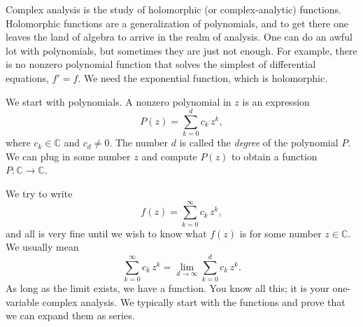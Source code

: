\documentclass[12pt,openany]{book}
\newcommand{\C}{{\mathbb{C}}}
\theoremstyle{plain}
\theoremstyle{remark}
\theoremstyle{definition}
\theoremstyle{exercise}
\theoremstyle{example}
\begin{document}
\medskip

Complex analysis is the study of holomorphic (or complex-analytic)
functions.
Holomorphic functions are a generalization of polynomials,
and to get there one leaves the land of algebra to arrive in the realm of
analysis.
One can do an awful lot with polynomials, but sometimes they are
just not enough.  For example, there is no nonzero polynomial function that solves
the simplest of differential equations, $f' = f$.  We need the exponential
function, which is holomorphic.

We start with polynomials.  A nonzero polynomial in $z$ is
an expression
\begin{equation*}
P(z) = \sum_{k=0}^d c_k \, z^k ,
\end{equation*}
where $c_k \in \C$ and $c_d \neq 0$.  The number $d$ is called the
\emph{degree}
of the
polynomial $P$.  We can plug in some number $z$ and compute
$P(z)$ to obtain a function $P \colon \C \to \C$.

We try to write
\begin{equation*}
f(z) = \sum_{k=0}^\infty c_k \, z^k ,
\end{equation*}
and all is very fine until we wish to know what $f(z)$ is for some number
$z \in \C$.
We usually mean
\begin{equation*}
\sum_{k=0}^\infty c_k \, z^k
=
\lim_{d\to\infty}
\sum_{k=0}^d c_k \, z^k .
\end{equation*}
As long as the limit exists, we have a function.  You know all
this; it is your one-variable complex analysis.  We typically
start with the functions and prove that we can expand them as series.
\end{document}
